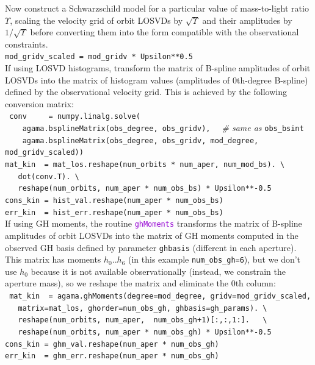 \documentclass[12pt]{article}
\newcommand{\ttt}[1]{\textcolor{darkviolet}{\texttt{#1}}}
\begin{document}
Now construct a Schwarzschild model for a particular value of mass-to-light ratio $\Upsilon$, scaling the velocity grid of orbit LOSVDs by $\sqrt{\Upsilon}$ and their amplitudes by $1/\sqrt{\Upsilon}$ before converting them into the form compatible with the observational constraints.\\[2mm]
\texttt{mod_gridv_scaled = mod_gridv * Upsilon**0.5}\\[2mm]
If using LOSVD histograms, transform the matrix of B-spline amplitudes of orbit LOSVDs into the matrix of histogram values (amplitudes of 0th-degree B-spline) defined by the observational velocity grid. This is achieved by the following conversion matrix:\\[2mm]
\texttt{
conv~~~~~= numpy.linalg.solve(\\
\mbox{}~~~~agama.bsplineMatrix(obs_degree, obs_gridv),}
{\color{Sepia}\textit{\ \ \# same as }\texttt{obs_bsint}}\\
\texttt{
\mbox{}~~~agama.bsplineMatrix(obs_degree, obs_gridv, mod_degree, mod_gridv_scaled))\\
mat_kin~~= mat_los.reshape(num_orbits * num_aper, num_mod_bs). \textbackslash\\
\mbox{}~~~dot(conv.T). \textbackslash\\
\mbox{}~~~reshape(num_orbits, num_aper * num_obs_bs) * Upsilon**-0.5\\
cons_kin~= hist_val.reshape(num_aper * num_obs_bs)\\
err_kin~~= hist_err.reshape(num_aper * num_obs_bs)}\\[2mm]
If using GH moments, the routine \ttt{ghMoments} transforms the matrix of B-spline amplitudes of orbit LOSVDs into the matrix of GH moments computed in the observed GH basis defined by parameter \texttt{ghbasis} (different in each aperture). This matrix has moments $h_0..h_6$ (in this example \texttt{num_obs_gh=6}), but we don't use $h_0$ because it is not available observationally (instead, we constrain the aperture mass), so we reshape the matrix and eliminate the 0th column:\\[2mm]
\texttt{
mat_kin~~= agama.ghMoments(degree=mod_degree, gridv=mod_gridv_scaled, \\
\mbox{}~~~matrix=mat_los, ghorder=num_obs_gh, ghbasis=gh_params). \textbackslash\\
\mbox{}~~~reshape(num_orbits, num_aper,~ num_obs_gh+1)[:,:,1:].~~ \textbackslash\\
\mbox{}~~~reshape(num_orbits, num_aper * num_obs_gh) * Upsilon**-0.5\\
cons_kin~= ghm_val.reshape(num_aper * num_obs_gh)\\
err_kin~~= ghm_err.reshape(num_aper * num_obs_gh)}\\[2mm]
\end{document}
